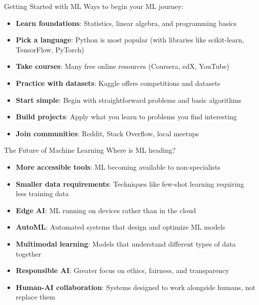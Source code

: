 \documentclass{beamer}
\begin{document}
\begin{frame}{Getting Started with ML}
  Ways to begin your ML journey:
  
  \begin{itemize}
    \item \textbf{Learn foundations}: Statistics, linear algebra, and programming basics
    \item \textbf{Pick a language}: Python is most popular (with libraries like scikit-learn, TensorFlow, PyTorch)
    \item \textbf{Take courses}: Many free online resources (Coursera, edX, YouTube)
    \item \textbf{Practice with datasets}: Kaggle offers competitions and datasets
    \item \textbf{Start simple}: Begin with straightforward problems and basic algorithms
    \item \textbf{Build projects}: Apply what you learn to problems you find interesting
    \item \textbf{Join communities}: Reddit, Stack Overflow, local meetups
  \end{itemize}
\end{frame}

\begin{frame}{The Future of Machine Learning}
  Where is ML heading?
  
  \begin{itemize}
    \item \textbf{More accessible tools}: ML becoming available to non-specialists
    \item \textbf{Smaller data requirements}: Techniques like few-shot learning requiring less training data
    \item \textbf{Edge AI}: ML running on devices rather than in the cloud
    \item \textbf{AutoML}: Automated systems that design and optimize ML models
    \item \textbf{Multimodal learning}: Models that understand different types of data together
    \item \textbf{Responsible AI}: Greater focus on ethics, fairness, and transparency
    \item \textbf{Human-AI collaboration}: Systems designed to work alongside humans, not replace them
  \end{itemize}
\end{frame}
\end{document}

